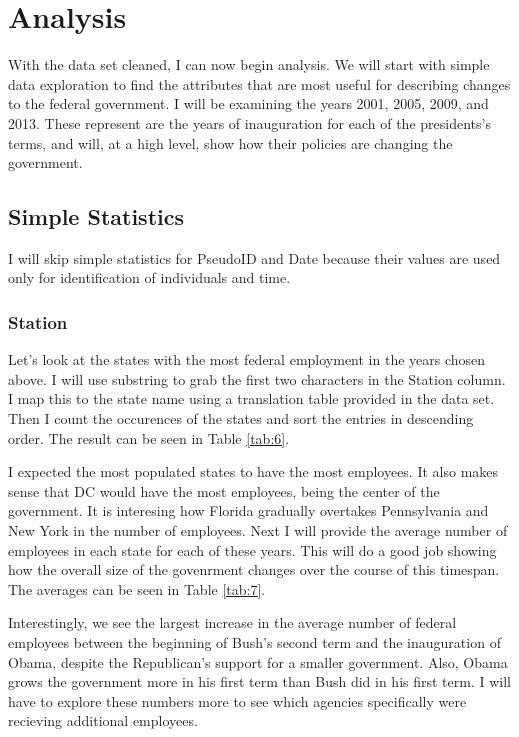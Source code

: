 \documentclass{article}
\begin{document}
\section{Analysis}
With the data set cleaned, I can now begin analysis. We will start with simple data exploration to find the attributes that are most useful for describing changes to the federal government. I will be examining the years 2001, 2005, 2009, and 2013. These represent are the years of inauguration for each of the presidents's terms, and will, at a high level, show how their policies are changing the government.

    \subsection{Simple Statistics}
    I will skip simple statistics for PseudoID and Date because their values are used only for identification of individuals and time.

        \subsubsection{Station}
        Let's look at the states with the most federal employment in the years chosen above. I will use substring to grab the first two characters in the Station column. I map this to the state name using a translation table provided in the data set. Then I count the occurences of the states and sort the entries in descending order. The result can be seen in Table \ref{tab:6}.
        \par
        I expected the most populated states to have the most employees. It also makes sense that DC would have the most employees, being the center of the government. It is interesing how Florida gradually overtakes Pennsylvania and New York in the number of employees. Next I will provide the average number of employees in each state for each of these years. This will do a good job showing how the overall size of the govenrment changes over the course of this timespan. The averages can be seen in Table \ref{tab:7}.
        \par
        Interestingly, we see the largest increase in the average number of federal employees between the beginning of Bush's second term and the inauguration of Obama, despite the Republican's support for a smaller government. Also, Obama grows the government more in his first term than Bush did in his first term. I will have to explore these numbers more to see which agencies specifically were recieving additional employees.
\end{document}
